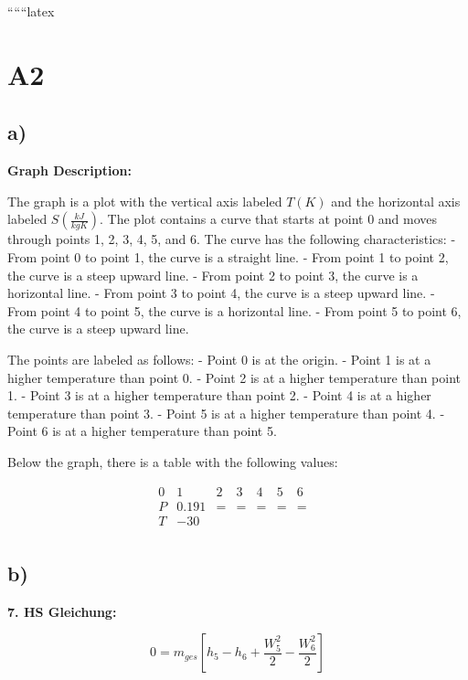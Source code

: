 
``````latex


\section*{A2}

\subsection*{a)}

\begin{center}
\textbf{Graph Description:}
\end{center}

The graph is a plot with the vertical axis labeled \( T(K) \) and the horizontal axis labeled \( S \left( \frac{kJ}{kgK} \right) \). The plot contains a curve that starts at point 0 and moves through points 1, 2, 3, 4, 5, and 6. The curve has the following characteristics:
- From point 0 to point 1, the curve is a straight line.
- From point 1 to point 2, the curve is a steep upward line.
- From point 2 to point 3, the curve is a horizontal line.
- From point 3 to point 4, the curve is a steep upward line.
- From point 4 to point 5, the curve is a horizontal line.
- From point 5 to point 6, the curve is a steep upward line.

The points are labeled as follows:
- Point 0 is at the origin.
- Point 1 is at a higher temperature than point 0.
- Point 2 is at a higher temperature than point 1.
- Point 3 is at a higher temperature than point 2.
- Point 4 is at a higher temperature than point 3.
- Point 5 is at a higher temperature than point 4.
- Point 6 is at a higher temperature than point 5.

Below the graph, there is a table with the following values:

\[
\begin{array}{ccccccc}
0 & 1 & 2 & 3 & 4 & 5 & 6 \\
P & 0.191 & = & = & = & = & = \\
T & -30 & & & & & & \\
\end{array}
\]

\subsection*{b)}

\textbf{7. HS Gleichung:}

\[
0 = m_{ges} \left[ h_5 - h_6 + \frac{W_5^2}{2} - \frac{W_6^2}{2} \right]
\]


